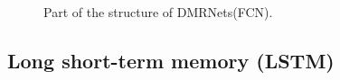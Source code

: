 \documentclass{article}
\begin{document}
 \begin{figure} [H]
  \centering
  \caption{Part of the structure of DMRNets(FCN).}
\end{figure}

\newpage

\subsection{Long short-term memory (LSTM)}
\end{document}
